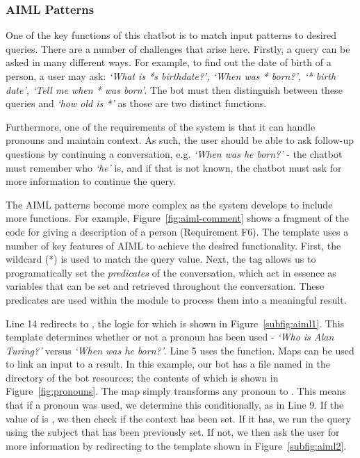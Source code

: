\subsubsection{AIML Patterns}
One of the key functions of this chatbot is to match input patterns to desired queries. There are a number of challenges that arise here. Firstly, a query can be asked in many different ways. For example, to find out the date of birth of a person, a user may ask: {\it`What is *s birthdate?', `When was * born?', `* birth date', `Tell me when * was born'}. The bot must then distinguish between these queries and {\it`how old is *'} as those are two distinct functions.

Furthermore, one of the requirements of the system is that it can handle pronouns and maintain context. As such, the user should be able to ask follow-up questions by continuing a conversation, e.g. {\it `When was he born?'} - the chatbot must remember who {\it `he'} is, and if that is not known, the chatbot must ask for more information to continue the query.

The AIML patterns become more complex as the system develops to include more functions. For example, Figure~\ref{fig:aiml-comment} shows a fragment of the code for giving a description of a person (Requirement F6). The template uses a number of key features of AIML to achieve the desired functionality.
First, the wildcard (*) is used to match the query value. Next, the  tag allows us to programatically set the {\it{predicates}} of the conversation, which act in essence as variables that can be set and retrieved throughout the conversation. These predicates are used within the  module to process them into a meaningful result.

Line 14 redirects to , the logic for which is shown in Figure~\ref{subfig:aiml1}.
This template determines whether or not a pronoun has been used - {\it{`Who is Alan Turing?'}} versus {\it{`When was he born?'}}. Line 5 uses the  function. Maps can be used to link an input to a result. In this example, our bot has a file named  in the  directory of the bot resources; the contents of which is shown in Figure~\ref{fig:pronouns}. The map simply transforms any pronoun to . This means that if a pronoun was used, we determine this conditionally, as in Line 9. If the value of  is , we then check if the context has been set. If it has, we run the query using the subject that has been previously set. If not, we then ask the user for more information by redirecting to the template shown in Figure~\ref{subfig:aiml2}.


